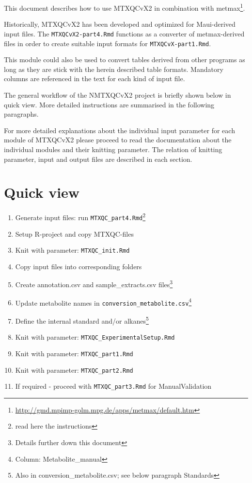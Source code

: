 \documentclass[]{book}
\providecommand{\tightlist}{%
  \setlength{\itemsep}{0pt}\setlength{\parskip}{0pt}}
\let\rmarkdownfootnote\footnote%
\def\footnote{\protect\rmarkdownfootnote}
\begin{document}
This document describes how to use MTXQCvX2 in combination with
metmax\footnote{\url{http://gmd.mpimp-golm.mpg.de/apps/metmax/default.htm}}.

Historically, MTXQCvX2 has been developed and optimized for Maui-derived
input files. The \texttt{MTXQCvX2-part4.Rmd} functions as a converter of
metmax-derived files in order to create suitable input formats for
\texttt{MTXQCvX-part1.Rmd}.

This module could also be used to convert tables derived from other
programs as long as they are stick with the herein described table
formats. Mandatory columns are referenced in the text for each kind of
input file.

The general workflow of the NMTXQCvX2 project is briefly shown below in
quick view. More detailed instructions are summarised in the following
paragraphs.

For more detailed explanations about the individual input parameter for
each module of MTXQCvX2 please proceed to read the documentation about
the individual modules and their knitting parameter. The relation of
knitting parameter, input and output files are described in each
section.

\section{Quick view}\label{quick-view-1}

\begin{enumerate}
\def\labelenumi{\arabic{enumi}.}
\tightlist
\item
  Generate input files: run \texttt{MTXQC\_part4.Rmd}\footnote{read here
    the instructions}
\item
  Setup R-project and copy MTXQC-files
\item
  Knit with parameter: \texttt{MTXQC\_init.Rmd}
\item
  Copy input files into corresponding folders
\item
  Create annotation.csv and sample\_extracts.csv files\footnote{Details
    further down this document}
\item
  Update metabolite names in
  \texttt{conversion\_metabolite.csv}\footnote{Column:
    Metabolite\_manual}
\item
  Define the internal standard and/or alkanes\footnote{Also in
    conversion\_metabolite.csv; see below paragraph Standards}
\item
  Knit with parameter: \texttt{MTXQC\_ExperimentalSetup.Rmd}
\item
  Knit with parameter: \texttt{MTXQC\_part1.Rmd}
\item
  Knit with parameter: \texttt{MTXQC\_part2.Rmd}
\item
  If required - proceed with \texttt{MTXQC\_part3.Rmd} for
  ManualValidation
\end{enumerate}
\end{document}
